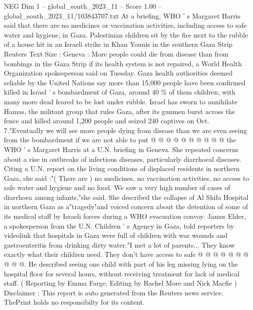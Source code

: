 \begin{textsample}{NEG Dim 1 – global\_south\_2023\_11 – Score 1.00 – global\_south\_2023\_11/103843707.txt}  \label{ex:f1_neg_230}
At a briefing, WHO ' s Margaret Harris said that there are no medicines or vaccination activities, including access to safe water and hygiene, in Gaza.
Palestinian children sit by the fire next to the rubble of a house hit in an Israeli strike in Khan Younis in the southern Gaza Strip Reuters Text Size : Geneva : More people could die from disease than from bombings in the Gaza Strip if its health system is not repaired, a World Health Organization spokesperson said on Tuesday.
Gaza health authorities deemed reliable by the United Nations say more than 15,000 people have been confirmed killed in Israel ' s bombardment of Gaza, around 40 \% of them children, with many more dead feared to be lost under rubble.
Israel has sworn to annihilate Hamas, the militant group that rules Gaza, after its gunmen burst across the fence and killed around 1,200 people and seized 240 captives on Oct. 7."Eventually we will see more people dying from disease than we are even seeing from the bombardment if we are not able to put @ @ @ @ @ @ @ @ @ @ the WHO ' s Margaret Harris at a U.N. briefing in Geneva.
She repeated concerns about a rise in outbreaks of infectious diseases, particularly diarrhoeal diseases.
Citing a U.N. report on the living conditions of displaced residents in northern Gaza, she said :"( There are ) no medicines, no vaccination activities, no access to safe water and hygiene and no food.
We saw a very high number of cases of diarrhoea among infants,"she said.
She described the collapse of Al Shifa Hospital in northern Gaza as a"tragedy"and voiced concern about the detention of some of its medical staff by Israeli forces during a WHO evacuation convoy.
James Elder, a spokesperson from the U.N.
Children ' s Agency in Gaza, told reporters by videolink that hospitals in Gaza were full of children with war wounds and gastroenteritis from drinking dirty water."I met a lot of parents...
They know exactly what their children need.
They don't have access to safe @ @ @ @ @ @ @ @ @ @.
He described seeing one child with part of his leg missing lying on the hospital floor for several hours, without receiving treatment for lack of medical staff. ( Reporting by Emma Farge, Editing by Rachel More and Nick Macfie ) Disclaimer : This report is auto generated from the Reuters news service.
ThePrint holds no responsibilty for its content.

\end{textsample}
